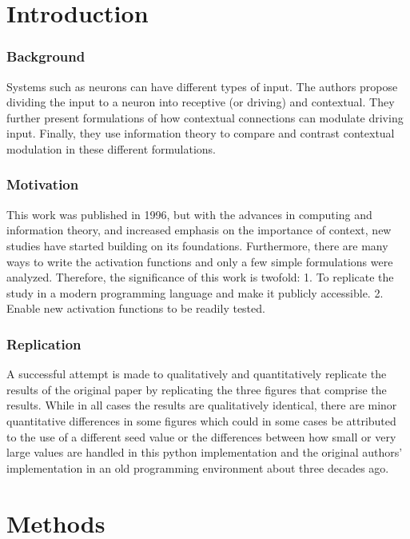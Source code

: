 \section{Introduction}


\subsubsection{Background}
Systems such as neurons can have different types of input. The authors\supercite{Smyth:1996} propose dividing the input to a neuron into receptive (or driving) and contextual. They further present formulations of how contextual connections can modulate driving input. Finally, they use information theory to compare and contrast contextual modulation in these different formulations.

\subsubsection{Motivation}
This work was published in 1996, but with the advances in computing and information theory, and increased emphasis on the importance of context\supercite{Larkum:2013}, new studies\supercite{Kay:2011,Wibral:2017} have started building on its foundations. Furthermore, there are many ways to write the activation functions and only a few simple formulations were analyzed. Therefore, the significance of this work is twofold: 1. To replicate the study in a modern programming language and make it publicly accessible.   2. Enable new activation functions to be readily tested.

\subsubsection{Replication}
A successful attempt is made to qualitatively and quantitatively replicate the results of the original paper by replicating the three figures that comprise the results. While in all cases the results are qualitatively identical, there are minor quantitative differences in some figures which could in some cases be attributed to the use of a different seed value or the differences between how small or very large values are handled in this python implementation and the original authors' implementation in an old programming environment about three decades ago. 

\section{Methods}


